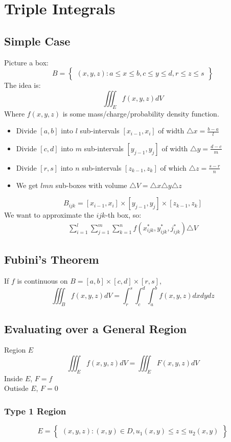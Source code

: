 \documentclass[12pt]{article}
\begin{document}
\section{Triple Integrals}
\subsection{Simple Case}
Picture a box:
\[
	B = \begin{Bmatrix}
		(x,y,z): a \leq x \leq b, c \leq y \leq d, r \leq z \leq s
	\end{Bmatrix}
\]
The idea is:
\[
	\iiint_{E} f(x,y,z)dV
\]
Where \(f(x,y,z)\) is some mass/charge/probability density function.

\begin{itemize}
	\item Divide \([a,b]\) into \(l\) sub-intervals \([x_{i-1},x_i]\) of width \(\triangle x = \frac{b-a}{l}\)
	\item Divide \([c,d]\) into \(m\) sub-intervals \([y_{j-1},y_j]\) of width \(\triangle y = \frac{d-c}{m}\)
	\item Divide \([r,s]\) into \(n\) sub-intervals \([z_{k-1}, z_k]\) of which \(\triangle z = \frac{s-r}{n}\)
	\item We get \(lmn\) sub-boxes with volume \(\triangle V = \triangle x \triangle y \triangle z\)
\end{itemize}
\[
	B_{ijk} = [x_{i-1},x_i] \times [y_{j-1}, y_j] \times [z_{k-1},z_k]
\]
We want to approximate the \(ijk\)-th box, so:
\begin{align*}
	\sum_{i=1}^{l} \sum_{j=1}^{m} \sum_{k=1}^{n} f(x_{ijk}^{*},y^{*}_{ijk},j^{*}_{ijk}) \triangle V
\end{align*}

\subsection{Fubini's Theorem}
If \(f\) is continuous on \(B= [a,b] \times [c,d] \times [r,s]	\),
\[
	\iiint_{B}f(x,y,z)dV = \int_{r}^{s}\int_{c}^{d}\int_{a}^{b}f(x,y,z)dxdydz
\]

\subsection{Evaluating over a General Region}
Region \(E\)
\[
	\iiint_E f(x,y,z)dV = \iiint_E F(x,y,z)dV
\]
Inside \(E\), \(F = f\) \\
Outisde \(E\), \(F = 0\)

\subsubsection{Type 1 Region}
\[
	E = \begin{Bmatrix}
		(x,y,z): (x,y) \in D, u_1(x,y) \leq z \leq u_2(x,y)
	\end{Bmatrix}
\]
\end{document}
